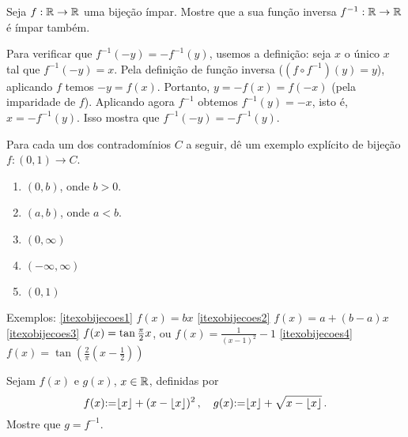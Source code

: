 \begin{exo}
Seja $f:\mathbb{R}\to \mathbb{R}$ uma bijeção ímpar. Mostre que a sua função inversa
$f^{-1}:\mathbb{R}\to\mathbb{R}$ é ímpar também.  
\begin{sol}
Para verificar que $f^{-1}(-y)=-f^{-1}(y)$, usemos a definição: seja $x$ o único
$x$ tal que $f^{-1}(-y)=x$. Pela definição de função inversa ($(f\circ
f^{-1})(y)=y$), aplicando
$f$ temos $-y=f(x)$. Portanto, $y=-f(x)=f(-x)$ (pela imparidade de $f$).
Aplicando agora $f^{-1}$ obtemos $f^{-1}(y)=-x$, isto é, $x=-f^{-1}(y)$. Isso
mostra que
$f^{-1}(-y)=-f^{-1}(y)$.
\end{sol}
\end{exo}

\begin{exo}
Para cada um dos contradomínios $C$ a seguir, dê um exemplo explícito de bijeção
$f:(0,1)\to C$.
\begin{multicols}{3}
\begin{enumerate}
 \item\label{itexobijecoes1} $(0,b)$, onde $b>0$.
\item\label{itexobijecoes2} $(a,b)$, onde $a<b$.
\item\label{itexobijecoes3} $(0,\infty)$
\item\label{itexobijecoes4} $(-\infty,\infty)$
\item\label{itexobijecoes5} $(0,1)$
\end{enumerate}
\end{multicols}
\vspace{0.01cm}
\begin{sol}
Exemplos:
\eqref{itexobijecoes1} $f(x)=bx$
\eqref{itexobijecoes2} $f(x)=a+(b-a)x$
\eqref{itexobijecoes3} $f(x)=\tan \tfrac{\pi}{2}{x}$, ou $f(x)=\tfrac{1}{(x-1)^2}-1$
\eqref{itexobijecoes4} $f(x)=\tan (\tfrac{2}{\pi}(x-\tfrac12))$
\end{sol}
\end{exo}

\begin{exo}
Sejam $f(x)$ e $g(x)$, $x\in \mathbb{R}$, definidas por 
$$
f(x){:=} \lfloor x \rfloor+(x-\lfloor x\rfloor)^2\,,\quad
g(x){:=} \lfloor x \rfloor+\sqrt{x-\lfloor x\rfloor}\,.
$$
Mostre que $g=f^{-1}$.
\end{exo}

